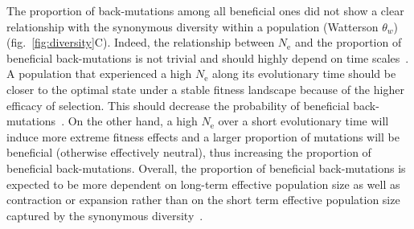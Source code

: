 \documentclass{article}
\newcommand{\Ne}{N_{\textrm{e}}}
\begin{document}
    The proportion of back-mutations among all beneficial ones did not show a clear relationship with the synonymous diversity within a population (Watterson $\theta_w$) (fig.~\ref{fig:diversity}C).
    Indeed, the relationship between $\Ne$ and the proportion of beneficial back-mutations is not trivial and should highly depend on time scales~\cite{charlesworth_other_2007}.
    A population that experienced a high $\Ne$ along its evolutionary time should be closer to the optimal state under a stable fitness landscape because of the higher efficacy of selection.
    This should decrease the probability of beneficial back-mutations~\cite{huber_determining_2017}.
    On the other hand, a high $\Ne$ over a short evolutionary time will induce more extreme fitness effects and a larger proportion of mutations will be beneficial (otherwise effectively neutral), thus increasing the proportion of beneficial back-mutations.
    Overall, the proportion of beneficial back-mutations is expected to be more dependent on long-term effective population size as well as contraction or expansion rather than on the short term effective population size captured by the synonymous diversity~\cite{charlesworth_other_2007,huber_determining_2017}.
\end{document}
